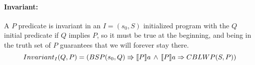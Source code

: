 \paragraph{Invariant:}
A $P$ predicate is invariant in an $I = (s_0,S)$ initialized program with the $Q$ initial predicate if $Q$ implies $P$, so it must be true at the beginning, and being in the truth set of $P$ guarantees that we will forever stay there. 
\begin{equation}
    Invariant_I(Q, P) = (BSP(s_0, Q) \Rrightarrow \llbracket P \rrbracket a \, \land \, \llbracket P \rrbracket a \Rightarrow CBLWP(S, P))
\end{equation}
\begin{code}
    \>[2]\AgdaSpace{}%
    \AgdaSymbol{:}\AgdaSpace{}%
    \AgdaSpace{}%
    \AgdaSpace{}%
    \AgdaSpace{}%
    \AgdaSpace{}%
    \AgdaSpace{}%
    \AgdaSpace{}%
    \<%
    \\
    \>[2]\AgdaSpace{}%
    \AgdaSpace{}%
    \AgdaOperator{\AgdaInductiveConstructor{,}}\AgdaSpace{}%
    \AgdaSymbol{)}\AgdaSpace{}%
    \AgdaSpace{}%
    \AgdaSpace{}%
    \AgdaSymbol{=}\AgdaSpace{}%
    \AgdaSymbol{((}\AgdaSpace{}%
    \AgdaSymbol{(}\AgdaSpace{}%
    \AgdaOperator{\AgdaInductiveConstructor{,}}\AgdaSpace{}%
    \AgdaSymbol{))}\AgdaSpace{}%
    \AgdaSpace{}%
    \AgdaSpace{}%
    \AgdaSpace{}%
    \AgdaSymbol{)}\AgdaSpace{}%
    \AgdaSpace{}%
    \AgdaSymbol{(}\AgdaSpace{}%
    \AgdaSpace{}%
    \AgdaSpace{}%
    \AgdaSpace{}%
    \AgdaSpace{}%
    \AgdaSymbol{(}\AgdaSpace{}%
    \AgdaOperator{\AgdaInductiveConstructor{,}}\AgdaSpace{}%
    \AgdaSymbol{))}\<%
    \\
    \\[\AgdaEmptyExtraSkip]%
    \>[2]\AgdaSpace{}%
    \AgdaSpace{}%
    \<%
    \\
    \>[2]\AgdaSpace{}%

\end{code}
